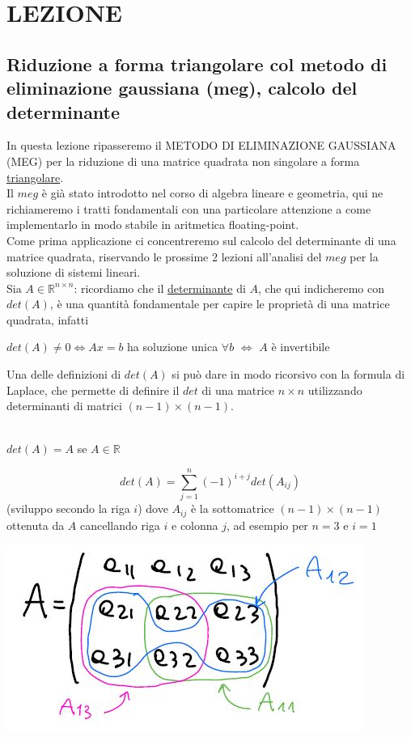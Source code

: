 \documentclass[12pt,a4paper]{article}
\begin{document}
\section*{LEZIONE }
\subsection*{Riduzione a forma triangolare col metodo di eliminazione gaussiana (meg), calcolo del determinante}
In questa lezione ripasseremo il METODO DI ELIMINAZIONE GAUSSIANA (MEG) per la riduzione di una matrice quadrata non singolare a forma \underline{triangolare}.\\ Il $meg$ è già stato introdotto nel corso di algebra lineare e geometria, qui ne richiameremo i tratti fondamentali con una particolare attenzione a come implementarlo in modo stabile in aritmetica floating-point.\\Come prima applicazione ci concentreremo sul calcolo del determinante di una matrice quadrata, riservando le prossime 2 lezioni all'analisi del $meg$ per la soluzione di sistemi lineari.\\Sia $A\in\mathbb{R}^{n\times n}$: ricordiamo che il \underline{determinante} di $A$, che qui indicheremo con $det(A)$, è una quantità fondamentale per capire le proprietà di una matrice quadrata, infatti 
\begin{center}
    $det(A)\neq0\iff Ax=b$ ha soluzione unica $\forall b$ $\iff$ $A$ è invertibile 
\end{center}
Una delle definizioni di $det(A)$ si può dare in modo ricorsivo con la formula di Laplace, che permette di definire il $det$ di una matrice $n\times n$ utilizzando determinanti di matrici $(n-1)\times(n-1)$.\\
\textbf{ }\\
\begin{center}
    $det(A)=A$ se $A\in\mathbb{R}$
\end{center}
\begin{equation*}
    det(A)=\sum_{j=1}^n(-1)^{i+j}det(A_{ij})
\end{equation*}
(sviluppo secondo la riga $i$) dove $A_{ij}$ è la sottomatrice $(n-1)\times(n-1)$ ottenuta da $A$ cancellando riga $i$ e colonna $j$, ad esempio per $n=3$ e $i=1$
\begin{center}
    \includegraphics[scale=0.5]{pag4.jpg}    
\end{center}
\end{document}
